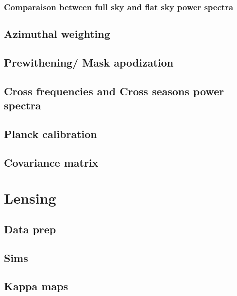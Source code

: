 \documentclass[a4paper, 11pt]{article}
\def\ba{\begin{eqnarray}}
\def\ea{\end{eqnarray}}
\begin{document}
\subsubsection{Comparaison between full sky and flat sky power spectra}


\subsection{Azimuthal weighting}

\subsection{Prewithening/ Mask apodization}

\subsection{Cross frequencies and Cross seasons  power spectra}

\subsection{Planck calibration}

\subsection{Covariance matrix}


 
\section{Lensing}

\subsection{Data prep}
\subsection{Sims}
\subsection{Kappa maps}
\end{document}
